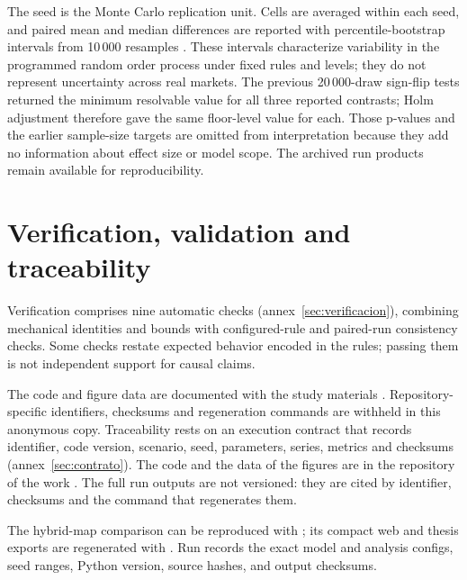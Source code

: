 The seed is the Monte Carlo replication unit. Cells are averaged within each seed, and paired mean and median differences are reported with percentile-bootstrap intervals from 10\,000 resamples \cite{efron1979bootstrap}. These intervals characterize variability in the programmed random order process under fixed rules and levels; they do not represent uncertainty across real markets. The previous 20\,000-draw sign-flip tests returned the minimum resolvable value for all three reported contrasts; Holm adjustment therefore gave the same floor-level value for each. Those p-values and the earlier sample-size targets are omitted from interpretation because they add no information about effect size or model scope. The archived run products remain available for reproducibility.

\section{Verification, validation and traceability}

Verification comprises nine automatic checks (annex~\ref{sec:verificacion}), combining mechanical identities and bounds with configured-rule and paired-run consistency checks. Some checks restate expected behavior encoded in the rules; passing them is not independent support for causal claims.

\ifdefined\blindreviewmode
The code and figure data are documented with the study materials \cite{calderon2026repository}. Repository-specific identifiers, checksums and regeneration commands are withheld in this anonymous copy.
\else
Traceability rests on an execution contract that records identifier, code version, scenario, seed, parameters, series, metrics and checksums (annex~\ref{sec:contrato}). The code and the data of the figures are in the repository of the work \cite{calderon2026repository}. The full run outputs are not versioned: they are cited by identifier, checksums and the command that regenerates them.

The hybrid-map comparison can be reproduced with ; its compact web and thesis exports are regenerated with . Run \code{\HybridRunID} records the exact model and analysis configs, seed ranges, Python version, source hashes, and output checksums.
\fi
